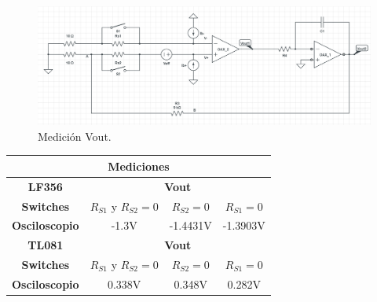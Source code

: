\begin{figure}[H]	
	\centering
	\includegraphics[width=\textwidth]{imagenes/Medicion.PNG}
	\caption{Medición Vout.}
	\label{fig:vout}
\end{figure}

\begin{table}[H]
\begin{center}
\begin{tabular}{|c|c|c|c|}
\hline
\multicolumn{4}{|c|}{\textbf{Mediciones}}                                        \\ \hline
\textbf{LF356}        & \multicolumn{3}{c|}{\textbf{Vout}}                       \\ \hline
\textbf{Switches}     & $R_{S1}$ y $ R_{S2} = 0$ & $ R_{S2} = 0$ & $ R_{S1} = 0$ \\ \hline
\textbf{Osciloscopio} & -1.3V                    & -1.4431V      & -1.3903V      \\ \hline
\textbf{TL081}        & \multicolumn{3}{c|}{\textbf{Vout}}                       \\ \hline
\textbf{Switches}     & $R_{S1}$ y $ R_{S2} = 0$ & $ R_{S2} = 0$ & $ R_{S1} = 0$ \\ \hline
\textbf{Osciloscopio} & 0.338V                   & 0.348V        & 0.282V        \\ \hline
\end{tabular}
\end{center}
\end{table}

